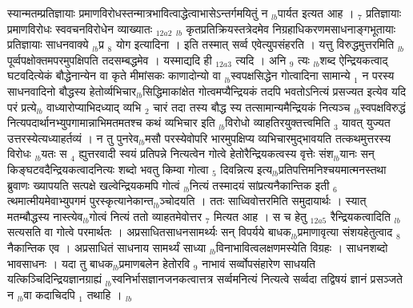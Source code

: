\documentclass[article,12pt,a4paper]{memoir}%
\begin{document}
	  
	  \pstart \leavevmode%
	स्यान्मतम्प्रतिज्ञायाः प्रमाणविरोधस्तन्मात्रभावित्वाद्धेत्वाभासेऽन्तर्गमयितुं न {\tiny $_{lb}$}पार्यत इत्यत आह । {\tiny $_{7}$} {\color{DodgerBlue3}प्रतिज्ञायाः प्रमाणविरोधः स्ववचनविरोधेन व्याख्यातः} {\tiny $_{12a2}$} {\tiny $_{lb}$} कृतप्रतिक्रियस्तत्रेदमेव निग्रहाधिकरणमसाधनाङ्गभूतायाः प्रतिज्ञायाः साधनवाक्ये {\tiny $_{lb}$}प्र {\tiny $_{8}$} योग इत्यादिना । इति तस्मात् सर्व्व एवेत्युपसंहरति । यत्तु विरुद्धमुत्तरमिति {\tiny $_{lb}$}पूर्व्वपक्षोक्तमपरमुपक्षिपति तदसम्बद्धमेव । {\color{DodgerBlue3}यस्माद्यदि ही {\tiny $_{12a3}$} त्यदि} । अनि {\tiny $_{9}$} \leavevmode{} त्यः {\tiny $_{lb}$}शब्द ऐन्द्रियकत्वाद् घटवदित्येकं बौद्धेनान्येन वा कृते {\color{DodgerBlue3}मीमांसकः काणादोन्यो} वा {\tiny $_{lb}$}स्वपक्षसिद्धेन गोत्वादिना सामान्ये {\tiny $_{1}$} न परस्य साधनवादिनो बौद्धस्य हेतोर्व्यभिचार{\tiny $_{lb}$}सिद्धिमाकांक्षेत गोत्वमप्यैन्द्रियकं तदपि भवतोऽनित्यं प्रसज्यत इत्येव यदि परं प्रत्ये{\tiny $_{lb}$}\leavevmode{} वाध्यारोप्याभिदध्याद् व्यभि {\tiny $_{2}$} चारं तदा तस्य {\color{DodgerBlue3}बौद्ध} स्य तत्सामान्यमैन्द्रियकं नित्यञ्च {\tiny $_{lb}$}स्वपक्षविरुद्धं नित्यपदार्थानभ्युपगामान्नाभिमतमतश्च कथं व्यभिचार इति {\tiny $_{lb}$}विरोधो व्याहतिरयुक्तत्त्वमिति {\tiny $_{3}$} यावत् युज्यत उत्तरस्येत्यध्याहर्तव्यं । न तु पुनरेव{\tiny $_{lb}$}मसौ परस्येवोपरि भारमुपक्षिप्य व्यभिचारमुद्भावयति तत्कथमुत्तरस्य विरोधः {\tiny $_{lb}$}यतः स {\tiny $_{4}$} ह्युत्तरवादी स्वयं प्रतिपन्ने नित्यत्वेन गोत्वे हेतोरैन्द्रियकत्वस्य वृत्तेः संश{\tiny $_{lb}$}यानः सन् किङ्घटवदैन्द्रियकत्वादनित्यः शब्दो भवतु किम्वा गोत्वा {\tiny $_{5}$} दिवन्नित्य इत्य{\tiny $_{lb}$}प्रतिपत्तिमनिश्चयमात्मनस्तथा ब्रुवाणः ख्यापयति सत्पक्षे खल्वेन्द्रियकमपि गोत्वं {\tiny $_{lb}$}नित्यं तस्मादयं सांप्रत्यनैकान्तिक इती {\tiny $_{6}$} त्थमात्मीयमेवाभ्युपगमं पुरस्कृत्यानेकान्त{\tiny $_{lb}$}ञ्चोदयति । ततः साध्विवोत्तरमिति समुदायार्थः । स्यात् मतम्बौद्धस्य नास्त्येव{\tiny $_{lb}$}गोत्वं नित्यं ततो व्याहतमेवोत्तर {\tiny $_{7}$} मित्यत आह । स च हेतु {\tiny $_{12a5}$} रैन्द्रियकत्वादिति {\tiny $_{lb}$}सत्यसति वा गोत्वे परमार्थतः । अप्रसाधितसाधनसामर्थ्यः सन् विपर्यये बाधक{\tiny $_{lb}$}प्रमाणावृत्या संशयहेतुत्वाद {\tiny $_{8}$} नैकान्तिक एव । अप्रसाधितं साधनाय सामर्थ्यं साध्या {\tiny $_{lb}$}विनाभावित्वलक्षणमस्येति विग्रहः । साधनशब्दो भावसाधनः । यदा तु बाधक{\tiny $_{lb}$}प्रमाणबलेन हेतोरवि {\tiny $_{9}$} \leavevmode{} नाभावं सर्व्वोपसंहारेण साधयति यत्किञ्चिदिन्द्रियज्ञानग्राह्यं {\tiny $_{lb}$}स्वनिर्भासज्ञानजनकत्वात्तत्र सर्व्वमनित्यं नित्यत्वे सर्व्वदा तद्विषयं ज्ञानं प्रसञ्जते न {\tiny $_{lb}$}वा कदाचिदपि {\tiny $_{1}$} तथाहि । {\tiny $_{lb}$} 
	    \pend%
	  
\end{document}
